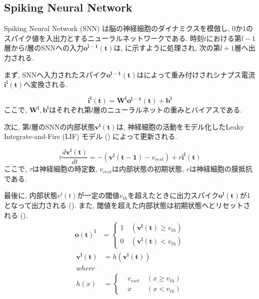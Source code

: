 \makeatletter %
\subsection{Spiking Neural Network}
Spiking Neural Network (SNN) は脳の神経細胞のダイナミクスを模倣し, 0か1のスパイク値を入出力とするニューラルネットワークである.
時刻$t$における第$l-1$層から$l$層のSNNへの入力$\bm{o^{l-1}(t)}$は, に示すように処理され, 次の第$l+1$層へ出力される.



まず, SNNへ入力されたスパイク$\bm{o^{l-1}(t)}$はによって重み付けされシナプス電流$\bm{i^l(t)}$へ変換される.

\begin{equation}
    \bm{i^l(t)} = \bm{W^l}\bm{o^{l-1}(t)} + \bm{b^l}
    \label{eq:input_spike}
\end{equation}
ここで, $\bm{W^l}, \bm{b^l}$はそれぞれ第$l$層のニューラルネットの重みとバイアスである.

次に, 第$l$層のSNNの内部状態$\bm{v^l(t)}$は, 神経細胞の活動をモデル化したLeaky Integrate-and-Fire (LIF) モデル () によって更新される.

\begin{equation}
    {\tau}\frac{d\bm{v^l(t)}}{dt}=-(\bm{v^l({t-1})}-v_{rest})+r\bm{i^l(t)}
    \label{eq:lif}
\end{equation}
ここで, $\tau$は神経細胞の時定数, $v_{rest}$は内部状態の初期状態, $r$は神経細胞の膜抵抗である.

最後に, 内部状態$v^l(t)$が一定の閾値$v_{th}$を超えたときに出力スパイク$\bm{o^l(t)}$が1となって出力される ().
また, 閾値を超えた内部状態は初期状態へとリセットされる ().
\begin{equation}
    \begin{split}
      \bm{o(t)^{l}}&=\left\{
        \begin{alignedat}{2}
          1 &\:(\bm{v^l(t)}{\geq}v_{th})\\
          0 &\:(\bm{v^l(t)}{<}v_{th})
        \end{alignedat}
      \right. 
    \end{split} \label{eq:outputSpike}
  \end{equation}
  \begin{equation}
    \begin{split}
      \bm{v^l(t)}&=h(\bm{v^l(t)})\\
    where\\
    h(x)&=\left\{
      \begin{alignedat}{2}
        &v_{rset} &\:(x{\geq}v_{th})\\
        &x &\:(x{<}v_{th})
      \end{alignedat}
    \right. 
    \end{split} \label{eq:outputSpike2}
  \end{equation}
